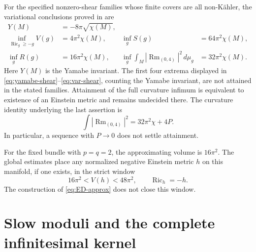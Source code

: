 \documentclass[11pt,a4paper]{article}
\theoremstyle{definition}\newtheorem{definition}[theorem]{Definition}
\theoremstyle{remark}\newtheorem{remark}[theorem]{Remark}
\DeclareMathOperator{\Ric}{Ric}
\DeclareMathOperator{\Rm}{Rm}
\newcommand{\dd}{\,d\mu_g}
\begin{document}
For the specified nonzero-shear families whose finite covers are all non-K\"ahler, the variational conclusions proved in \cite{source-integrated} are
\begin{align}
 Y(M)&=-8\pi\sqrt{\chi(M)},\label{eq:yamabe-shear}\\
 \inf_{\Ric_g\ge-g}V(g)&=4\pi^2\chi(M),&
 \inf_g S(g)&=64\pi^2\chi(M),\label{eq:var-shear}\\
 \inf_g R(g)&=16\pi^2\chi(M),&
 \inf_g\int_M|\Rm_{(0,4)}|^2\dd&=32\pi^2\chi(M).
 \nonumber
\end{align}
Here $Y(M)$ is the Yamabe invariant. The first four extrema displayed in \eqref{eq:yamabe-shear}--\eqref{eq:var-shear}, counting the Yamabe invariant, are not attained in the stated families. Attainment of the full curvature infimum is equivalent to existence of an Einstein metric and remains undecided there. The curvature identity underlying the last assertion is
\[
 \int|\Rm_{(0,4)}|^2=32\pi^2\chi+4P.
\]
In particular, a sequence with $P\to0$ does not settle attainment.

For the fixed bundle with $p=q=2$, the approximating volume is $16\pi^2$. The global estimates place any normalized negative Einstein metric $h$ on this manifold, if one exists, in the strict window
\begin{equation}\label{eq:ED-window}
 16\pi^2<V(h)<48\pi^2,\qquad \Ric_h=-h.
\end{equation}
The construction of \eqref{eq:ED-approx} does not close this window.

\section{Slow moduli and the complete infinitesimal kernel}
\end{document}

